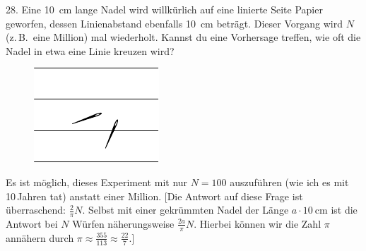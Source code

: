 \begin{problem}{28.}
	Eine \SI{10}{\cm} lange Nadel wird willkürlich auf eine linierte Seite Papier geworfen, dessen Linienabstand ebenfalls \SI{10}{\cm} beträgt. Dieser Vorgang wird $N$ (z.\,B.\ eine Million) mal wiederholt. 
	Kannst du eine Vorhersage treffen, wie oft die Nadel in etwa eine Linie kreuzen wird?
	\begin{figure}[H]
		\centering
		\includegraphics{taskbook-12}
	\end{figure}
	Es ist möglich, dieses Experiment mit nur $N=100$ auszuführen (wie ich es mit 10\,Jahren tat) anstatt einer Million. [Die Antwort auf diese Frage ist überraschend: $\frac2{\pi}N$. Selbst mit einer gekrümmten Nadel der Länge $a \cdot \SI{10}{\cm}$ ist die Antwort bei $N$ Würfen näherungsweise $\frac{2a}{\pi}N$. 
	Hierbei können wir die Zahl $\pi$ annähern durch $\pi \approx \frac{355}{113} \approx \frac{22}7.$]
\end{problem}

